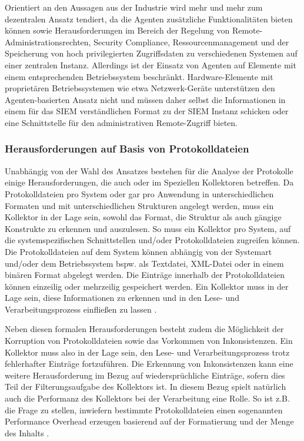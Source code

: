 Orientiert an den Aussagen aus der Industrie wird mehr und mehr zum dezentralen Ansatz tendiert, da die Agenten zusätzliche Funktionalitäten bieten können sowie Herausforderungen im Bereich der Regelung von Remote-Administrationsrechten, Security Compliance, Ressourcenmanagement und der Speicherung von hoch privilegierten Zugriffsdaten zu verschiedenen Systemen auf einer zentralen Instanz. Allerdings ist der Einsatz von Agenten auf Elemente mit einem entsprechenden Betriebssystem beschränkt. Hardware-Elemente mit proprietären Betriebssystemen wie etwa Netzwerk-Geräte unterstützen den Agenten-basierten Ansatz nicht und müssen daher selbst die Informationen in einem für das SIEM verständlichen Format zu der SIEM Instanz schicken oder eine Schnittstelle für den administrativen Remote-Zugriff bieten.


\subsubsection{Herausforderungen auf Basis von Protokolldateien}
Unabhängig von der Wahl des Ansatzes bestehen für die Analyse der Protokolle einige Herausforderungen, die auch oder im Speziellen Kollektoren betreffen. Da Protokolldateien pro System oder gar pro Anwendung in unterschiedlichen Formaten und mit unterschiedlichen Strukturen angelegt werden, muss ein Kollektor in der Lage sein, sowohl das Format, die Struktur als auch gängige Konstrukte zu erkennen und auszulesen. So muss ein Kollektor pro System, auf die systemspezifischen Schnittstellen und/oder Protokolldateien zugreifen können. Die Protokolldateien auf dem System können abhängig von der Systemart und/oder dem Betriebssystem bspw. als Textdatei, XML-Datei oder in einem binären Format abgelegt werden. Die Einträge innerhalb der Protokolldateien können einzeilig oder mehrzeilig gespeichert werden. Ein Kollektor muss in der Lage sein, diese Informationen zu erkennen und in den Lese- und Verarbeitungsprozess einfließen zu lassen \citep{6261962}. 

Neben diesen formalen Herausforderungen besteht zudem die Möglichkeit der Korruption von Protokolldateien sowie das Vorkommen von Inkonsistenzen. Ein Kollektor muss also in der Lage sein, den Lese- und Verarbeitungsprozess trotz fehlerhafter Einträge fortzuführen. Die Erkennung von Inkonsistenzen kann eine weitere Herausforderung im Bezug auf wiedersprüchliche Einträge, sofern dies Teil der Filterungsaufgabe des Kollektors ist. In diesem Bezug spielt natürlich auch die Performanz des Kollektors bei der Verarbeitung eine Rolle. So ist z.B. die Frage zu stellen, inwiefern bestimmte Protokolldateien einen sogenannten \glqq Performance Overhead\grqq{} erzeugen basierend auf der Formatierung und der Menge des Inhalts \citep{6261962}.


